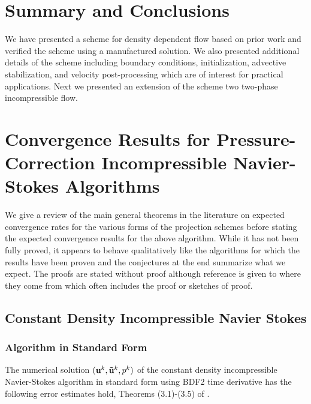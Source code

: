 \documentclass[letterpaper]{erdc}
\begin{document}
\chapter{Summary and Conclusions}

We have presented a scheme for density dependent flow based on prior work and
verified the scheme using a manufactured solution. We also presented additional
details of the scheme including boundary conditions, initialization, advective
stabilization, and velocity post-processing which are of interest for practical
applications. Next we presented an extension of the scheme two two-phase
incompressible flow.

%
%
%






\appendix


%
%
%
%
\chapter{Convergence Results for Pressure-Correction Incompressible Navier-Stokes Algorithms}\label{ch:LiteratureReview}
We give a review of the main general theorems in the literature on expected
convergence rates for the various forms of the projection schemes before
stating the expected convergence results for the above algorithm.  While it has
not been fully proved, it appears to behave qualitatively like the algorithms
for which the results have been proven and the conjectures at the end summarize
what we expect.  The proofs are stated without proof although reference is
given to where they come from which often includes the proof or sketches of
proof.

%
%
%
\section{Constant Density Incompressible Navier Stokes}

%
%
\subsection{Algorithm in Standard Form}
The numerical solution $(\textbf{u}^k, \mathbf{\tilde{u}}^k,p^k)$ of the constant density
incompressible Navier-Stokes algorithm in standard form using BDF2 time
derivative has the following error estimates hold, Theorems (3.1)-(3.5) of
\cite{guermond1997resultat}.
\end{document}
